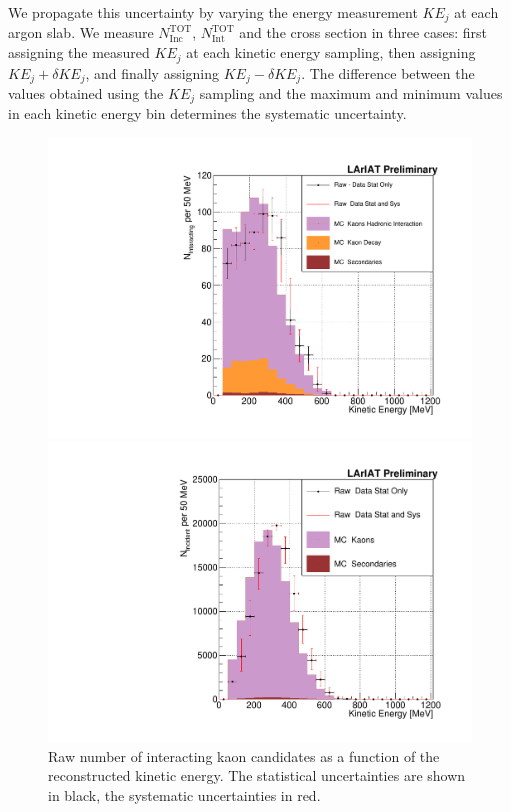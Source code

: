 We propagate this uncertainty  by varying the energy measurement $KE_{j}$ at each argon slab. We measure $N^{\text{TOT}}_{\text{Inc}}$,  $N^{\text{TOT}}_{\text{Int}}$ and the cross section  in three cases: first assigning the measured $KE_{j}$ at each kinetic energy sampling, then assigning $KE_{j} + \delta KE_{j}$, and finally assigning $KE_{j} - \delta KE_{j}$. The difference between the values obtained using the $KE_{j}$ sampling and the maximum and minimum values in each kinetic energy bin determines the systematic uncertainty.

\begin{figure}[]
\centering
\begin{minipage}[t]{0.45\textwidth}
\centering
\includegraphics[width=\textwidth]{Chapter-7/Images/Plots_MCData_Int_StatSystK_WithDK.pdf}
\caption{Raw number of interacting kaon candidates as a function of the reconstructed kinetic energy. The statistical uncertainties are shown in black, the systematic uncertainties in red.}
\label{fig:InteractingRawK}
\end{minipage}\hfill
\begin{minipage}[t]{0.45\textwidth}
\centering
\includegraphics[width=\textwidth]{Chapter-7/Images/Plots_MCData_Inc_StatSystK_WithDK.pdf}

\end{minipage}
\end{figure}
